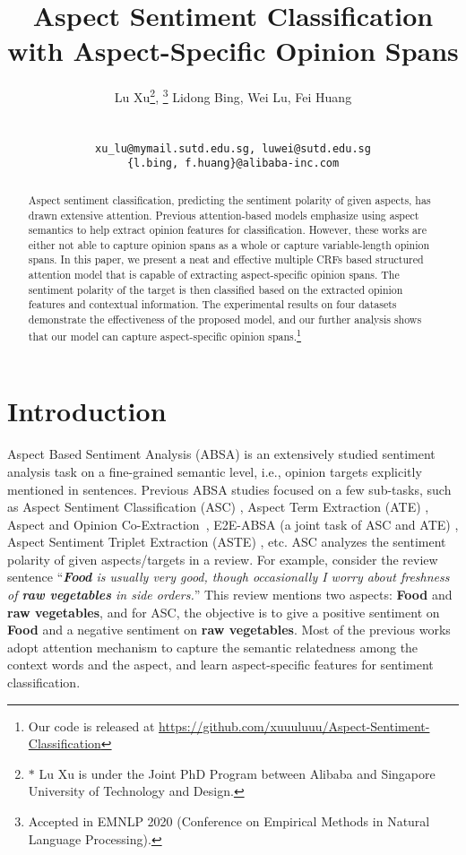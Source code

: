\documentclass[11pt,a4paper]{article}
\title{Aspect Sentiment Classification with Aspect-Specific Opinion Spans}
\author{Lu Xu\affmark[* 1, 2]\thanks{$*$ Lu Xu is under the Joint PhD Program between Alibaba and Singapore University of Technology and Design.},
\thanks {Accepted in EMNLP 2020 (Conference on Empirical Methods in Natural Language Processing).}
Lidong Bing\affmark[2], Wei Lu\affmark[1], Fei Huang\affmark[2]\\
\affaddr{\affmark[1]StatNLP Research Group, Singapore University of Technology and Design}\\
\affaddr{\affmark[2]DAMO Academy, Alibaba Group}\\
\tt{xu\_lu@mymail.sutd.edu.sg, luwei@sutd.edu.sg}\\
\tt{\{l.bing, f.huang\}@alibaba-inc.com}\\
}
\date{}
\begin{document}
\maketitle
\begin{abstract}
Aspect sentiment classification, predicting the sentiment polarity of given aspects, has drawn extensive attention. 
Previous attention-based models emphasize using aspect semantics to help extract opinion features for classification. 
However, these works are either not able to capture opinion spans as a whole or capture variable-length opinion spans.
In this paper, we present a neat and effective multiple CRFs based structured attention model that is capable of extracting aspect-specific opinion spans. 
The sentiment polarity of the target is then classified based on the extracted opinion features and contextual information.
The experimental results on four datasets demonstrate the effectiveness of the proposed model, and our further analysis shows that our model can capture aspect-specific opinion spans.\footnote{Our code is released at \url{https://github.com/xuuuluuu/Aspect-Sentiment-Classification}}
\end{abstract}


\section{Introduction}
\label{sec:intro}



Aspect Based Sentiment Analysis (ABSA) \cite{Pang:2008:OMS:1454711.1454712, liu2012sentiment} is an extensively studied sentiment analysis task on a fine-grained semantic level, i.e., opinion targets explicitly mentioned in sentences. Previous ABSA studies focused on a few sub-tasks, such as Aspect Sentiment Classification (ASC) \cite{wang-etal-2016-attention,chen-EtAl:2017:EMNLP20171, ma2018targeted}, Aspect Term Extraction (ATE) \cite{li2018aspect,he-etal-2017-unsupervised},  Aspect and Opinion Co-Extraction~\cite{P13-1172, wang2017coupled,P18-2094,dai2019neural}, E2E-ABSA (a joint task of ASC and ATE) \cite{li2019unified,he-etal-2019-interactive,li-etal-2019-transferable}, Aspect Sentiment Triplet Extraction (ASTE) \cite{peng2020, xu2020}, etc. 
ASC analyzes the sentiment polarity of given aspects/targets in a review. For example, consider the review sentence ``\textit{\textbf{Food} is usually very good, though occasionally I worry about freshness of \textbf{raw vegetables} in side orders.}'' This review mentions two aspects: \textbf{Food} and  \textbf{raw vegetables}, and for ASC, the objective is to  give a positive sentiment on \textbf{Food} and a negative sentiment on \textbf{raw vegetables}.
Most of the previous works \cite{wang-etal-2016-attention, chen-EtAl:2017:EMNLP20171, liu-zhang:2017:EACLshort, Yang2017AttentionBL,  Li2018ExploitingCT, he-etal-2018-effective, li-lu-2019-learning, Hu2019LearningTD} adopt attention mechanism \cite{DBLP:journals/corr/BahdanauCB14} to capture the semantic relatedness among the context words and the aspect, and learn aspect-specific features for sentiment classification. 
\end{document}
